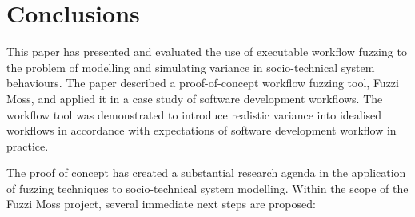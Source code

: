 \documentclass{sig-alternate}
\begin{document}

\section{Conclusions}
\label{sec:conclusions}


This paper has presented and evaluated the use of executable workflow fuzzing to
the problem of modelling and simulating variance in socio-technical system
behaviours.  The paper described a proof-of-concept workflow fuzzing tool, Fuzzi
Moss, and applied it in a case study of software development workflows.  The
workflow tool was demonstrated to introduce realistic variance into idealised
workflows in accordance with expectations of software development workflow in
practice.

The proof of concept has created a substantial research agenda in the
application of fuzzing techniques to socio-technical system modelling.  Within
the scope of the Fuzzi Moss project, several immediate next steps are proposed:
\end{document}
